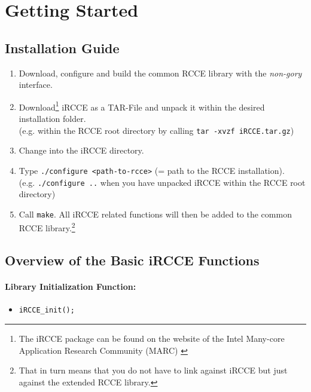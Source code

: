 \documentclass[fontsize=10pt, paper=a4, DIV12, pagesize=auto]{scrartcl}
\begin{document}
\section{Getting Started}\label{sec:started}

\subsection{Installation Guide}\label{subsec:install}

\begin{enumerate}
	\item Download, configure and build the common RCCE library with the \emph{non-gory} interface.
	\item Download\footnote{The iRCCE package can be found on the website of the Intel Many-core Application Research Community (MARC) \cite{MARC}} iRCCE as a TAR-File and unpack it within the desired installation folder. \\
	(e.g. within the RCCE root directory by calling \texttt{tar -xvzf iRCCE.tar.gz})
	\item Change into the iRCCE directory.
	\item Type \texttt{./configure <path-to-rcce>} (= path to the RCCE installation). \\
	(e.g. \texttt{./configure ..} when you have unpacked iRCCE within the RCCE root directory)
	\item Call \texttt{make}. All iRCCE related functions will then be added to the common RCCE library.\footnote{That in turn means that you do not have to link against iRCCE but just against the extended RCCE library.}
\end{enumerate}
\vspace{-0.3cm}

\subsection{Overview of the Basic iRCCE Functions}

\paragraph{Library Initialization Function:}
\begin{itemize}
	\item \texttt{iRCCE\_init();}
\end{itemize}
\vspace{-0.3cm}
\end{document}
